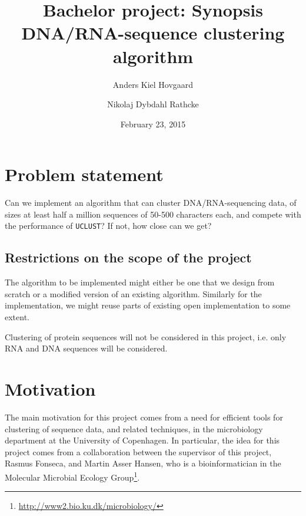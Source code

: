 \documentclass[11pt,a4paper]{article}
\title{Bachelor project: Synopsis \\
       \vspace{2mm}
       {\LARGE DNA/RNA-sequence clustering algorithm}} %
\author{Anders Kiel Hovgaard \and Nikolaj Dybdahl Rathcke}
\date{February 23, 2015}
\begin{document}
\maketitle
\thispagestyle{fancy}

\section{Problem statement}
Can we implement an algorithm that can cluster DNA/RNA-sequencing data, of
sizes at least half a million sequences of 50-500 characters each, and compete
with the performance of \texttt{UCLUST}? If not, how close can we get?



\subsection{Restrictions on the scope of the project}

The algorithm to be implemented might either be one that we design from scratch
or a modified version of an existing algorithm. Similarly for the
implementation, we might reuse parts of existing open implementation to some
extent.

Clustering of protein sequences will not be considered in this project, i.e.
only RNA and DNA sequences will be considered.


\section{Motivation}
The main motivation for this project comes from a need for efficient tools for
clustering of sequence data, and related techniques, in the microbiology
department at the University of Copenhagen. In particular, the idea for this
project comes from a collaboration between the supervisor of this project,
Rasmus Fonseca, and Martin Asser Hansen, who is a bioinformatician in the
Molecular Microbial Ecology
Group\footnote{\url{http://www2.bio.ku.dk/microbiology/}}.
\end{document}
